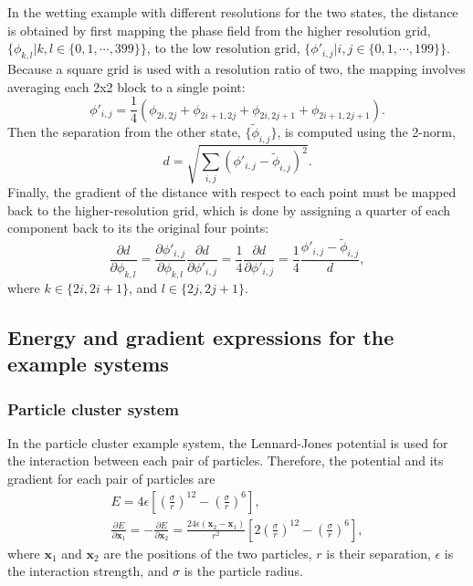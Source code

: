 \documentclass[twocolumn,10pt]{revtex4}
\begin{document}
In the wetting example with different resolutions for the two states, the distance is obtained by first mapping the phase field from the higher resolution grid, $\{\phi_{k,l} | k,l \in \{0,1,\cdots,399\}\}$, to the low resolution grid, $\{\phi'_{i,j} | i,j \in \{0,1,\cdots,199\}\}$.
Because a square grid is used with a resolution ratio of two, the mapping involves averaging each 2x2 block to a single point:
\begin{equation}
  \phi'_{i,j} = \frac{1}{4} \left( \phi_{2i,2j} + \phi_{2i+1,2j} + \phi_{2i,2j+1} + \phi_{2i+1,2j+1} \right).
\end{equation}
Then the separation from the other state, $\{\widetilde{\phi}_{i,j}\}$, is computed using the 2-norm,
\begin{equation}
  d = \sqrt{\sum_{i,j} \left( \phi'_{i,j} - \widetilde{\phi}_{i,j} \right)^2}.
\end{equation}
Finally, the gradient of the distance with respect to each point must be mapped back to the higher-resolution grid, which is done by assigning a quarter of each component back to its the original four points:
\begin{equation}
  \frac{\partial d}{\partial \phi_{k,l}} =
    \frac{\partial \phi'_{i,j}}{\partial \phi_{k,l}} \frac{\partial d}{\partial \phi'_{i,j}} =
    \frac{1}{4} \frac{\partial d}{\partial \phi'_{i,j}} =
    \frac{1}{4} \frac{\phi'_{i,j} - \widetilde{\phi}_{i,j}}{d},
\end{equation}
where $k \in \{2i, 2i+1\}$, and $l \in \{2j, 2j+1\}$.

\subsection{Energy and gradient expressions for the example systems}
\subsubsection{Particle cluster system}
In the particle cluster example system, the Lennard-Jones potential is used for the interaction between each pair of particles.
Therefore, the potential and its gradient for each pair of particles are
\begin{gather}
  E = 4\epsilon \left[ \left(\frac{\sigma}{r}\right)^{12} - \left(\frac{\sigma}{r}\right)^6 \right], \\
  \frac{\partial E}{\partial \bm{x}_1} = -\frac{\partial E}{\partial \bm{x}_2} =
    \frac{24 \epsilon (\bm{x}_2 - \bm{x}_1)}{r^2} \left[ 2 \left(\frac{\sigma}{r}\right)^{12} - \left(\frac{\sigma}{r}\right)^6 \right],
\end{gather}
where $\bm{x}_1$ and $\bm{x}_2$ are the positions of the two particles, $r$ is their separation, $\epsilon$ is the interaction strength, and $\sigma$ is the particle radius.
\end{document}
